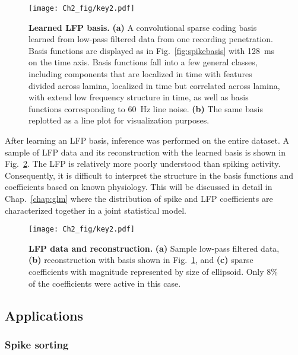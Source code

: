 \begin{figure}[htp!]
  \centering
  \texttt{[image: Ch2\_fig/key2.pdf]}
  \caption{\textbf{Learned LFP basis.} \textbf{(a)} A convolutional
    sparse coding basis learned from low-pass filtered data from one
    recording penetration. Basis functions are displayed as in
    Fig.~\ref{fig:spikebasis} with 128~ms on the time axis. Basis
    functions fall into a few general classes, including components
    that are localized in time with features divided across lamina,
    localized in time but correlated across lamina, with extend low
    frequency structure in time, as well as basis functions
    corresponding to 60~Hz line noise. \textbf{(b)} The same basis
    replotted as a line plot for visualization purposes.}
  \label{fig:lfpbasis}
\end{figure}
\afterpage{\clearpage}

After learning an LFP basis, inference was performed on the entire
dataset. A sample of LFP data and its reconstruction with the learned
basis is shown in Fig.~\ref{fig:lfprecon}. The LFP is relatively more
poorly understood than spiking activity. Consequently, it is difficult
to interpret the structure in the basis functions and coefficients
based on known physiology. This will be discussed in detail in
Chap.~\ref{chap:glm} where the distribution of spike and LFP
coefficients are characterized together in a joint statistical model.

\begin{figure}[htp!]
  \centering
  \texttt{[image: Ch2\_fig/key2.pdf]}
  \caption{\textbf{LFP data and reconstruction.} \textbf{(a)} Sample
    low-pass filtered data, \textbf{(b)} reconstruction with basis
    shown in Fig.~\ref{fig:lfpbasis}, and \textbf{(c)} sparse
    coefficients with magnitude represented by size of ellipsoid. Only
    8\% of the coefficients were active in this case.}
  \label{fig:lfprecon}
\end{figure}
\clearpage


\subsection{Applications}

\subsubsection{Spike sorting}
\label{sec:spikesort}

